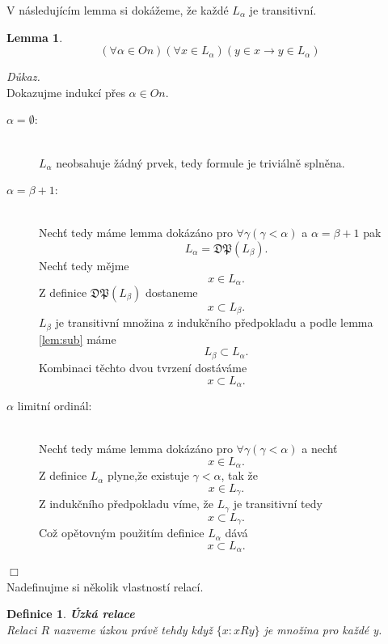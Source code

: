 \documentclass[12pt,a4paper]{article}
\newtheorem{lemma}[veta]{Lemma}
\newtheorem{definice}[veta]{Definice}
\newenvironment{proof}
{\noindent \textit{D\r{u}kaz.}}
{\hspace*{\fill} $\Box$}
\begin{document}
V n\'{a}sleduj\'{i}c\'{i}m lemma si dok\'{a}\v{z}eme, \v{z}e ka\v{z}d\'{e}  $ L_\alpha $ je transitivn\'{i}.
\begin{lemma}
~\\
\label{lem:Ltran}
\[ (\forall \alpha \in \textit{On}) (\forall x \in L_\alpha)( y \in x \rightarrow y \in L_\alpha)  \]
\end{lemma}
\begin{proof}
~\\ Dokazujme indukc\'{i} p\v{r}es $ \alpha \in \textit{On} $.
~\begin{description}
\item[$ \alpha=\emptyset $:]~\\ 
 $ L_\alpha $ neobsahuje \v{z}\'{a}dn\'{y} prvek, tedy formule je trivi\'{a}ln\v{e} spln\v{e}na.
\item[$ \alpha=\beta+1 $:] ~\\ 
Nech\v{t} tedy m\'{a}me lemma dok\'{a}z\'{a}no pro $ \forall \gamma ( \gamma <  \alpha )$ a $  \alpha=\beta + 1 $ pak
\[ L_\alpha=\mathfrak{DP}(L_\beta) .\]
Nech\v{t} tedy m\v{e}jme 
\[ x \in L_\alpha .\]
Z definice $ \mathfrak{DP}(L_\beta) $ dostaneme
\[ x \subset L_\beta .\]
 $ L_\beta $ je transitivn\'{i} mno\v{z}ina z induk\v{c}n\'{i}ho p\v{r}edpokladu a podle lemma \ref{lem:sub} m\'{a}me
\[ L_\beta \subset L_\alpha .\]
Kombinaci t\v{e}chto dvou tvrzen\'{i} dost\'{a}v\'{a}me 
\[ x \subset L_\alpha.\]
\item[$ \alpha  $ limitn\'{i} ordin\'{a}l:]~\\
Nech\v{t} tedy m\'{a}me lemma dok\'{a}z\'{a}no pro $ \forall \gamma ( \gamma <  \alpha )$ a nech\v{t} 
\[  x \in L_\alpha .\]
Z definice $ L_\alpha  $ plyne,\v{z}e existuje   $   \gamma <  \alpha $, tak \v{z}e 
\[  x \in L_\gamma .\]
Z induk\v{c}n\'{i}ho p\v{r}edpokladu v\'{i}me, \v{z}e $  L_\gamma $ je transitivn\'{i} tedy
\[  x \subset L_\gamma .\]
Co\v{z} op\v{e}tovn\'{y}m pou\v{z}it\'{i}m definice $ L_\alpha  $ d\'{a}v\'{a} 
\[  x \subset L_\alpha.\]
\end{description}
\end{proof}~\\

Nadefinujme si n\v{e}kolik vlastnost\'{i} relac\'{i}.
\begin{definice}
\textbf{\'{U}zk\'{a} relace}\\
Relaci $ R $ nazveme \'{u}zkou pr\'{a}v\v{e} tehdy kdy\v{z}  $ \{x: xRy \} $ je mno\v{z}ina pro ka\v{z}d\'{e} y. 
\end{definice}
\end{document}
